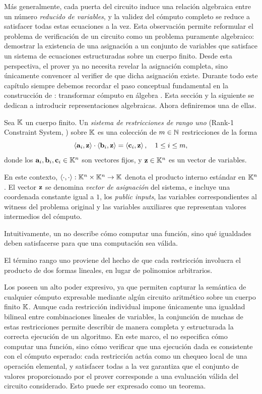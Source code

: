 Más generalmente, cada puerta del circuito induce una relación algebraica entre un número \textit{reducido de variables}, y la validez del cómputo completo se reduce a satisfacer todas estas ecuaciones a la vez. Esta observación permite reformular el problema de verificación de un circuito como un problema puramente algebraico: demostrar la existencia de una asignación a un conjunto de variables que satisface un sistema de ecuaciones estructuradas sobre un cuerpo finito. Desde esta perspectiva, el prover ya no necesita revelar la asignación completa, sino únicamente convencer al verifier de que dicha asignación existe. Durante todo este capítulo siempre debemos recordar el paso conceptual fundamental en la construcción de \SNARK: transformar cómputo en álgebra \cite{Gennaro2013, Parno2016}. Esta sección y la siguiente se dedican a introducir representaciones algebraicas. Ahora definiremos una de ellas.

\begin{definition}[\ROneCS]
\label{def:apendice-b-r1cs-ronecs}
	Sea $\mathbb{K}$ un cuerpo finito. Un \emph{sistema de restricciones de rango uno} (Rank-1 Constraint System, \ROneCS) sobre $\mathbb{K}$ es una colección de $m \in \mathbb{N}$ restricciones de la forma
	$$\left\langle \mathbf{a}_i, \mathbf{z} \right\rangle \cdot \left\langle \mathbf{b}_i, \mathbf{z} \right\rangle = \left\langle \mathbf{c}_i, \mathbf{z} \right\rangle, \quad 1 \leq i \leq m,$$
		donde los $\mathbf{a}_i, \mathbf{b}_i, \mathbf{c}_i \in \mathbb{K}^n$ son vectores fijos, y $\mathbf{z} \in \mathbb{K}^n$ es un vector de variables.
	
		En este contexto, $\left\langle \cdot, \cdot \right\rangle: \mathbb{K}^n \times \mathbb{K}^n \to \mathbb{K}$ denota el producto interno estándar en $\mathbb{K}^n$. El vector $\mathbf{z}$ se denomina \emph{vector de asignación} del sistema, e incluye una coordenada constante igual a $1$, los \textit{public inputs}, las variables correspondientes al witness del problema original y las variables auxiliares que representan valores intermedios del cómputo.
	\end{definition}

Intuitivamente, un \ROneCS no describe cómo computar una función, sino qué igualdades deben satisfacerse para que una computación sea válida.

El término rango uno proviene del hecho de que cada restricción involucra el producto de dos formas lineales, en lugar de polinomios arbitrarios.

Los \ROneCS poseen un alto poder expresivo, ya que permiten capturar la semántica de cualquier cómputo expresable mediante algún circuito aritmético sobre un cuerpo finito $\mathbb{K}$. Aunque cada restricción individual impone únicamente una igualdad bilineal entre combinaciones lineales de variables, la conjunción de muchas de estas restricciones permite describir de manera completa y estructurada la correcta ejecución de un algoritmo. En este marco, el \ROneCS no especifica cómo computar una función, sino cómo verificar que una ejecución dada es consistente con el cómputo esperado: cada restricción actúa como un chequeo local de una operación elemental, y satisfacer todas a la vez garantiza que el conjunto de valores proporcionado por el prover corresponde a una evaluación válida del circuito considerado. Esto puede ser expresado como un teorema.

